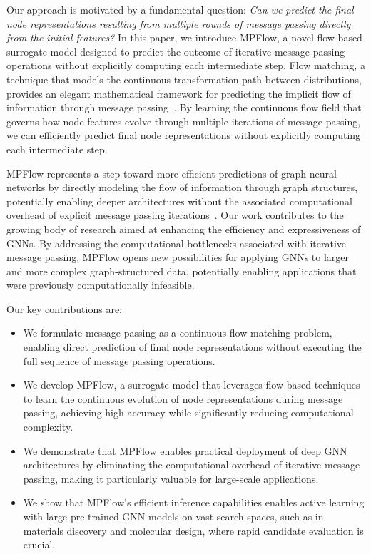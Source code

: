 \documentclass{article}
\begin{document}
Our approach is motivated by a fundamental question: \emph{Can we predict the final node representations resulting from multiple rounds of message passing directly from the initial features?} In this paper, we introduce MPFlow, a novel flow-based surrogate model designed to predict the outcome of iterative message passing operations without explicitly computing each intermediate step.
Flow matching, a technique that models the continuous transformation path between distributions, provides an elegant mathematical framework for predicting the implicit flow of information through message passing~\citep{lipman2022flow, liu2022flow}.
By learning the continuous flow field that governs how node features evolve through multiple iterations of message passing, we can efficiently predict final node representations without explicitly computing each intermediate step. 

MPFlow represents a step toward more efficient predictions of graph neural networks by directly modeling the flow of information through graph structures, potentially enabling deeper architectures without the associated computational overhead of explicit message passing iterations~\citep{xhonneux2020continuous}. 
Our work contributes to the growing body of research aimed at enhancing the efficiency and expressiveness of GNNs. By addressing the computational bottlenecks associated with iterative message passing, MPFlow opens new possibilities for applying GNNs to larger and more complex graph-structured data, potentially enabling applications that were previously computationally infeasible.

Our key contributions are:
\begin{itemize}
\item We formulate message passing as a continuous flow matching problem, enabling direct prediction of final node representations without executing the full sequence of message passing operations.
\item We develop MPFlow, a surrogate model that leverages flow-based techniques to learn the continuous evolution of node representations during message passing, achieving high accuracy while significantly reducing computational complexity.
\item We demonstrate that MPFlow enables practical deployment of deep GNN architectures by eliminating the computational overhead of iterative message passing, making it particularly valuable for large-scale applications.
\item We show that MPFlow's efficient inference capabilities enables active learning with large pre-trained GNN models on vast search spaces, such as in materials discovery and molecular design, where rapid candidate evaluation is crucial.
\end{itemize}
\end{document}

